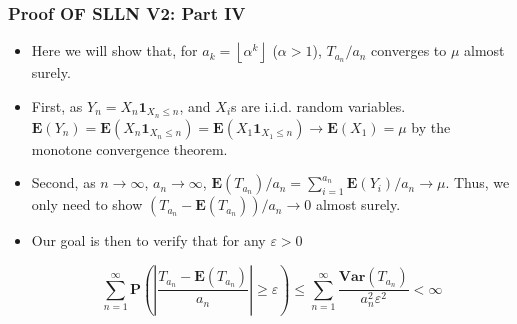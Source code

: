 \documentclass[handout]{beamer}
\newcommand{\BP}{\mathbf{P}}
\newcommand{\BE}{\mathbf{E}}
\newcommand{\BI}{\mathbf{1}}
\newcommand{\BV}{\mathbf{Var}}
\begin{document}
\frame
{
  \frametitle{Proof OF SLLN V2: Part IV}

   \begin{itemize}
   \item<1-> Here we will show that, for  $a_k=\left \lfloor{\alpha^k}\right \rfloor$ ($\alpha>1$), $T_{a_n}/a_n$ converges to $\mu$ almost surely. 
       
        
    \item<2->[-] First, as $Y_n=X_n \BI_{X_n\leq n}$, and $X_i$s are i.i.d. random variables. $\BE(Y_n)=\BE(X_n \BI_{X_n\leq n} )=\BE(X_1 \BI_{X_1\leq n} )\rightarrow \BE(X_1)=\mu$ by the monotone convergence theorem.  
    
        \item<3->[-]  Second, as $n\rightarrow \infty$, $a_n\rightarrow \infty$, $\BE(T_{a_n}) /a_n=\sum_{i=1}^{a_n} \BE(Y_i)/a_n \rightarrow \mu $. Thus, we only need to show  $ (T_{a_n}-\BE(T_{a_n}) )/a_n \rightarrow 0$ almost surely. 
        
                \item<4->[-]  Our goal is then to verify that for any $\varepsilon >0$
                
                $$\sum_{n=1}^{\infty} \BP\left( \left| \frac{T_{a_n}-\BE(T_{a_n})}{a_n} \right|\geq \varepsilon\right)\leq \sum_{n=1}^{\infty}\frac{\BV(T_{a_n})}{a_n^2 \varepsilon^2}<\infty$$
                  
                                                
\end{itemize}
}
\end{document}
